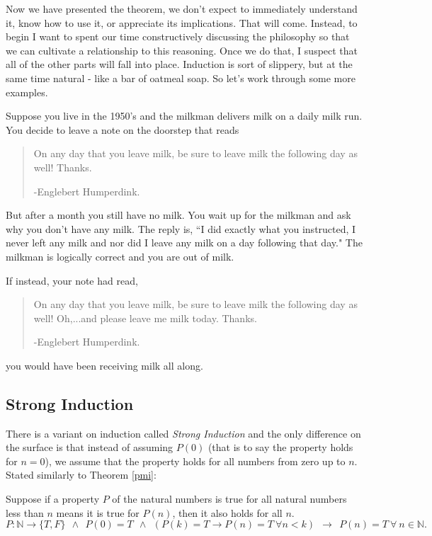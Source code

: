 Now we have presented the theorem, we don't expect to immediately understand it, know how to use it, or appreciate its implications.  That will come.  Instead, to begin I want to spent our time constructively discussing the philosophy so that we can cultivate a relationship to this reasoning.  Once we do that, I suspect that all of the other parts will fall into place.  Induction is sort of slippery, but at the same time natural - like a bar of oatmeal soap. So let's work through some more examples.

\begin{example}
Suppose you live in the 1950's and the milkman delivers milk on a daily milk run.  You decide to leave a note on the doorstep that reads
\begin{quotation}
On any day that you leave milk, be sure to leave milk the following day as well!  Thanks.

\hfill -Englebert Humperdink.
\end{quotation}
But after a month you still have no milk.  You wait up for the milkman and ask why you don't have any milk.  The reply is, ``I did exactly what you instructed, I never left any milk and nor did I leave any milk on a day following that day."  The milkman is logically correct and you are out of milk.

If instead, your note had read,
\begin{quotation}
On any day that you leave milk, be sure to leave milk the following day as well!  Oh,...and please leave me milk today.  Thanks.

\hfill -Englebert Humperdink.
\end{quotation}
you would have been receiving milk all along.
\end{example}

\subsection*{Strong Induction}
There is a variant on induction called \emph{Strong Induction} and the only difference on the surface is that instead of assuming $P(0)$  (that is to say the property holds for $n=0$), we assume that the property holds for all numbers from zero up to $n$.  Stated similarly to Theorem \ref{pmi}:

\begin{theorem} 
Suppose if a property $P$ of the natural numbers is true for all natural numbers less than $n$ means it is true for $P(n)$, then it also holds for all $n$.
$$P: \mathbb{N}\to \{T, F \}~~\land~~ P(0) = T ~~\land~~ (P(k) = T\to P(n) = T~\forall n<k) ~~\to ~~P(n) = T ~\forall~ n\in\mathbb{N}.$$
\label{psmi}
\end{theorem}

